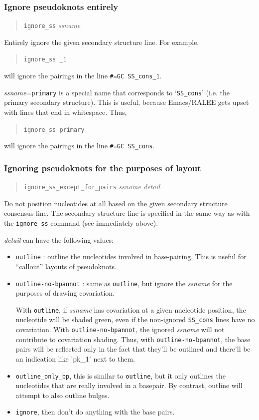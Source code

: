 \documentclass[letterpaper,12pt]{report}
\newcommand{\example}[1]{
\begin{quote}
{\raggedright
#1
}
\end{quote}
}
\newcommand{\examplett}[1]{
\example{{\tt #1}}
}
\begin{document}
\subsubsection{Ignore pseudoknots entirely}
\example{{\tt ignore\_ss} \textit{ssname}}

Entirely ignore the given secondary structure line.  For example,

\examplett{ignore\_ss \_1}

will ignore the pairings in the line {\tt \#=GC SS\_cons\_1}.

\textit{ssname}={\tt primary} is a special
name that corresponds to {\textquoteleft}{\tt SS\_cons}{\textquoteright}
(i.e. the primary secondary structure).  This is useful, because
Emacs/RALEE gets upset with lines that end in whitespace.  Thus,

\examplett{ignore\_ss primary}

will ignore the pairings in the line {\tt \#=GC SS\_cons}.

\subsubsection{Ignoring pseudoknots for the purposes of layout}
\label{sec:ignoressexceptforpairs}
\example{
{\tt ignore\_ss\_except\_for\_pairs}
 \textit{ssname  detail}
}

Do not position nucleotides at all based on the given secondary structure
consensus line.
The secondary structure line is specified in the same way
as with the {\tt ignore\_ss} command (see immediately above).

\textit{detail} can have the following values:
\begin{itemize}
\item {\tt outline} :  outline the nucleotides involved in
  base-pairing.  This is useful for ``callout'' layouts of pseudoknots.
\item {\tt outline-no-bpannot} : same as {\tt outline}, but ignore the {\it ssname} for the purposes of drawing covariation.

  With {\tt outline}, if {\it ssname} has covariation at a given nucleotide position, the nucleotide will be shaded green, even if the non-ignored {\tt SS\_cons} lines have no covariation.  With {\tt outline-no-bpannot}, the ignored {\it ssname} will not contribute to covariation shading.  Thus, with {\tt outline-no-bpannot}, the base pairs will be reflected only in the fact that they'll be outlined and there'll be an indication like 'pk\_1' next to them.
\item {\tt outline\_only\_bp}, this is similar to {\tt outline}, but
it only outlines the nucleotides that are really involved in a
basepair. By contrast, outline will attempt to also outline bulges.
\item {\tt ignore}, then don{\textquoteright}t do anything
with the base pairs.
\end{itemize}
\end{document}
